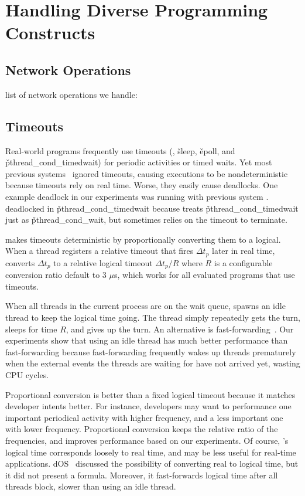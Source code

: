 \section{Handling Diverse Programming Constructs}

\subsection{Network Operations}

list of network operations we handle:

\subsection{Timeouts} \label{sec:timeout}

Real-world programs frequently use timeouts (\eg, \v{sleep}, \v{epoll},
and \v{pthread\_cond\_timedwait}) for periodic activities or timed waits.
Yet most previous systems~\cite{xxx} ignored timeouts, causing executions to
be nondeterministic because timeouts rely on real time.  Worse, they
easily cause deadlocks.  One example deadlock in our experiments was
running \pbzip with previous system \dthreads.  \pbzip deadlocked in
\v{pthread\_cond\_timedwait} because \dthreads treats
\v{pthread\_cond\_timedwait} just as \v{pthread\_cond\_wait}, but \pbzip
sometimes relies on the timeout to terminate.

\parrot makes timeouts deterministic by proportionally converting them to a
logical.  When a thread registers a relative timeout that fires $\Delta
t_p$ later in real time, \parrot converts $\Delta t_p$ to a relative logical
timeout $\Delta t_p /R$ where $R$ is a configurable conversion ratio
default to 3 $\mu$s, which works for all evaluated programs that use
timeouts.

When all threads in the current process are on the wait queue, \parrot spawns
an idle thread to keep the logical time going. The thread simply
repeatedly gets the turn, sleeps for time $R$, and gives up the turn.  An
alternative is fast-forwarding~\cite{modist:nsdi09}.  Our experiments show
that using an idle thread has much better performance than fast-forwarding
because fast-forwarding frequently wakes up threads prematurely when the
external events the threads are waiting for have not arrived yet, wasting
CPU cycles.

Proportional conversion is better than a fixed logical timeout because it
matches developer intents better.  For instance, developers may want to
performance one important periodical activity with higher frequency, and a
less important one with lower frequency.  Proportional conversion keeps
the relative ratio of the frequencies, and improves performance based on
our experiments.  Of course, \parrot's logical time corresponds loosely to
real time, and may be less useful for real-time applications.
dOS~\cite{dos:osdi10} discussed the possibility of converting real to
logical time, but it did not present a formula.  Moreover, it
fast-forwards logical time after all threads block, slower than using an
idle thread.

